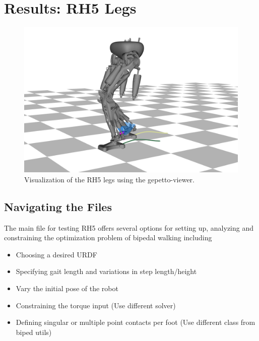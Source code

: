   
\section{Results: RH5 Legs}\label{sec:resultsRH5}
\begin{figure}[h!]
\centering
\includegraphics[width=1\linewidth]{Media/Crocoddyl/crocoddylRH5Legs.png}
\caption{Visualization of the RH5 legs using the gepetto-viewer.}
\end{figure}

\subsection{Navigating the Files}
The main file for testing RH5 offers several options for setting up, analyzing and constraining the optimization problem of bipedal walking including
\begin{itemize}
\item Choosing a desired URDF 
\item Specifying gait length and variations in step length/height
\item Vary the initial pose of the robot
\item Constraining the torque input (Use different solver)
\item Defining singular or multiple point contacts per foot (Use different class from biped utils)
\end{itemize}

